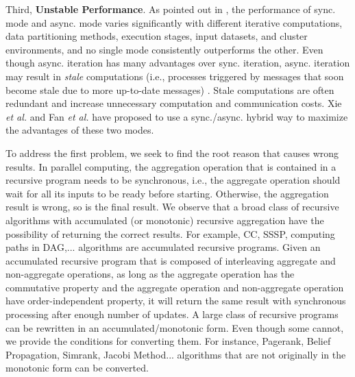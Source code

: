 Third, \textbf{Unstable Performance}. As pointed out in \cite{Xie2015SYNC}, the performance of sync. mode and async. mode varies significantly with different iterative computations, data partitioning methods, execution stages, input datasets, and cluster environments, and no single mode consistently outperforms the other. Even though async. iteration has many advantages over sync. iteration, async. iteration may result in \emph{stale} computations (i.e., processes triggered by messages that soon become stale due to more up-to-date messages) \cite{Fan2018Adaptive}. Stale computations are often redundant and increase unnecessary computation and communication costs. Xie \emph{et al.} \cite{Xie2015SYNC} and Fan \emph{et al.} \cite{Fan2018Adaptive} have proposed to use a sync./async. hybrid way to maximize the advantages of these two modes.



To address the first problem, we seek to find the root reason that causes wrong results. In parallel computing, the aggregation operation that is contained in a recursive program needs to be synchronous, i.e., the aggregate operation should wait for all its inputs to be ready before starting. Otherwise, the aggregation result is wrong, so is the final result. We observe that a broad class of recursive algorithms with accumulated (or monotonic) recursive aggregation have the possibility of returning the correct results. For example, CC, SSSP, computing paths in DAG,... algorithms are accumulated recursive programs. Given an accumulated recursive program that is composed of interleaving aggregate and non-aggregate operations, as long as the aggregate operation has the commutative property and the aggregate operation and non-aggregate operation have order-independent property, it will return the same result with synchronous processing after enough number of updates. A large class of recursive programs can be rewritten in an accumulated/monotonic form. Even though some cannot, we provide the conditions for converting them. For instance, Pagerank, Belief Propagation, Simrank, Jacobi Method... algorithms that are not originally in the monotonic form can be converted.

